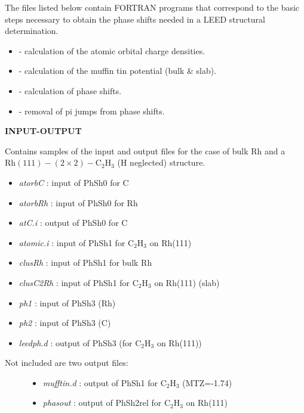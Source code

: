 \documentclass[letterpaper,10pt,english]{sphinxmanual}
\begin{document}
The files listed below contain FORTRAN programs that correspond to the basic
steps necessary to obtain the phase shifts needed in a LEED structural
determination.
\begin{itemize}
\item {} 
    - calculation of the atomic orbital charge densities.

\item {} 
    - calculation of the muffin tin potential (bulk \& slab).

\item {} 
   - calculation of phase shifts.

\item {} 
    - removal of pi jumps from phase shifts.

\end{itemize}

\textbf{INPUT-OUTPUT}

Contains samples of the input and output files for the case of bulk
Rh and a $\text{Rh} (111)-(2 \times 2)- \text{C} _2 \text{H} _3$ (H neglected) structure.
\begin{itemize}
\item {} 
\emph{atorbC}     : input of PhSh0 for C

\item {} 
\emph{atorbRh}    : input of PhSh0 for Rh

\item {} 
\emph{atC.i}      : output of PhSh0 for C

\item {} 
\emph{atomic.i}   : input of PhSh1 for $\text{C} _2 \text{H} _3$ on Rh(111)

\item {} 
\emph{clusRh}     : input of PhSh1 for bulk Rh

\item {} 
\emph{clusC2Rh}   : input of PhSh1 for $\text{C} _2 \text{H} _3$ on Rh(111) (slab)

\item {} 
\emph{ph1}        : input of PhSh3 (Rh)

\item {} 
\emph{ph2}        : input of PhSh3 (C)

\item {} 
\emph{leedph.d}   : output of PhSh3 (for $\text{C} _2 \text{H} _3$ on Rh(111))

\end{itemize}
\begin{description}
\item[{Not included are two output files:}] \leavevmode\begin{itemize}
\item {} 
\emph{mufftin.d}  : output of PhSh1 for $\text{C} _2 \text{H} _3$ (MTZ=-1.74)

\item {} 
\emph{phasout}    : output of PhSh2rel for $\text{C} _2 \text{H} _3$ on Rh(111)

\end{itemize}

\end{description}
\end{document}
